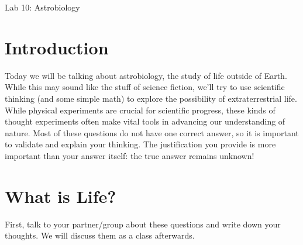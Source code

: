 \documentclass[12pt]{article}%
\begin{document}
\thispagestyle{empty}

\begin{center}
    \huge Lab 10: Astrobiology
\end{center}


\section{Introduction}

Today we will be talking about astrobiology, the study of life outside of Earth. While this may sound like the stuff of science fiction, we'll try to use scientific thinking (and some simple math) to explore the possibility of extraterrestrial life. While physical experiments are crucial for scientific progress, these kinds of thought experiments often make vital tools in advancing our understanding of nature. Most of these questions do not have one correct answer, so it is important to validate and explain your thinking. The justification you provide is more important than your answer itself: the true answer remains unknown!


\section{What is Life?}

First, talk to your partner/group about these questions and write down your thoughts. We will discuss them as a class afterwards. 
\end{document}
